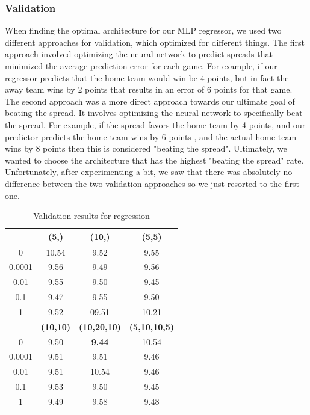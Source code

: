 \documentclass{article}
\begin{document}
\subsubsection{Validation}

When finding the optimal architecture for our MLP regressor, we used two different approaches for validation, which optimized for different things. The first approach involved optimizing the neural network to predict spreads that minimized the average prediction error for each game. For example, if our regressor predicts that the home team would win be 4 points, but in fact the away team wins by 2 points that results in an error of 6 points for that game. The second approach was a more direct approach towards our ultimate goal of beating the spread. It involves optimizing the neural network to specifically beat the spread. For example, if the spread favors the home team by 4 points, and our predictor predicts the home team wins by 6 points , and the actual home team wins by 8 points then this is considered "beating the spread". Ultimately, we wanted to choose the architecture that has the highest "beating the spread" rate. Unfortunately, after experimenting a bit, we saw that there was absolutely no difference between the two validation approaches so we just resorted to the first one.

\begin{table}
  \begin{center}
    \begin{tabular}{ | c | c | c | c |}
      \hline

            &             	\textbf{(5,)} & 	\textbf{(10,)} & 	\textbf{(5,5)}   	 \\ \hline
	  0  &     	10.54 & 	9.52&	9.55	  \\ \hline
	  0.0001 &   9.56 &     	9.49&	9.56 \\ \hline
	  0.01  &    	9.55 &     	9.50& 	9.45    \\ \hline
	  0.1	&	9.47&	9.55 &	9.50  \\ \hline
	  1	&	9.52 &	09.51&	 10.21\\ \hline \hline
		       &	\textbf{(10,10)} & 	\textbf{(10,20,10)} & 	\textbf{(5,10,10,5)}  \\ \hline
		0      &	9.50&	\textbf{9.44}&	10.54	    \\ \hline
		0.0001& 9.51&		9.51&	9.46	    \\ \hline
		0.01 & 9.51&	10.54&		9.46	    \\ \hline
		0.1 & 9.53&	9.50&		9.45	    \\ \hline
		1 & 9.49&	9.58&		9.48	    \\ \hline
    \end{tabular}
  \end{center}
  \caption{Validation results for regression}
\end{table}
\end{document}
